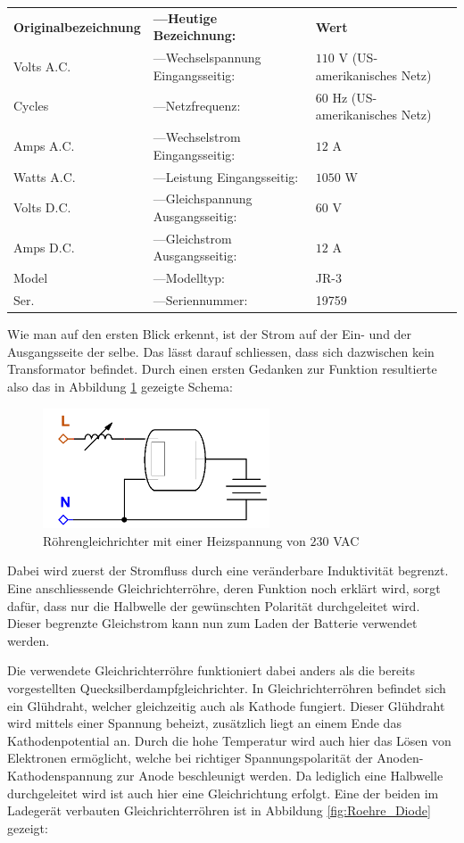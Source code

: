 \begin{tabular}{lll}
	\textbf{Originalbezeichnung} & \textbf{---\quad Heutige Bezeichnung:} & \textbf{Wert} \\
	Volts A.C. & ---\quad Wechselspannung Eingangsseitig: & $110$ V (US-amerikanisches Netz) \\
	Cycles & ---\quad Netzfrequenz: & $60$ Hz (US-amerikanisches Netz)\\
	Amps A.C. & ---\quad Wechselstrom Eingangsseitig: & $12$ A \\
	Watts A.C. & ---\quad Leistung Eingangsseitig: & $1050$ W \\
	Volts D.C. & ---\quad Gleichspannung Ausgangsseitig: & $60$ V \\
	Amps D.C. & ---\quad Gleichstrom Ausgangsseitig: & $12$ A \\
	Model & ---\quad Modelltyp: & JR-3 \\
	Ser. & ---\quad Seriennummer: & 19759
\end{tabular}

Wie man auf den ersten Blick erkennt, ist der Strom auf der Ein- und der Ausgangsseite der selbe. Das lässt darauf schliessen, dass sich dazwischen kein Transformator befindet. Durch einen ersten Gedanken zur Funktion resultierte also das in Abbildung \ref{fig:Ladegeraet1} gezeigte Schema:

\begin{figure}[h]
	\centering
		\includegraphics[width=0.60\textwidth]{images/Ladegeraet_Alt_1.PNG}
	\caption{Röhrengleichrichter mit einer Heizspannung von $230$ VAC}
	\label{fig:Ladegeraet1}
\end{figure}

Dabei wird zuerst der Stromfluss durch eine veränderbare Induktivität begrenzt. Eine anschliessende Gleichrichterröhre, deren Funktion noch erklärt wird, sorgt dafür, dass nur die Halbwelle der gewünschten Polarität durchgeleitet wird. Dieser begrenzte Gleichstrom kann nun zum Laden der Batterie verwendet werden.

Die verwendete Gleichrichterröhre funktioniert dabei anders als die bereits vorgestellten Quecksilberdampfgleichrichter. In Gleichrichterröhren befindet sich ein Glühdraht, welcher gleichzeitig auch als Kathode fungiert. Dieser Glühdraht wird mittels einer Spannung beheizt, zusätzlich liegt an einem Ende das Kathodenpotential an. Durch die hohe Temperatur wird auch hier das Lösen von Elektronen ermöglicht, welche bei richtiger Spannungspolarität der Anoden-Kathodenspannung zur Anode beschleunigt werden. Da lediglich eine Halbwelle durchgeleitet wird ist auch hier eine Gleichrichtung erfolgt. Eine der beiden im Ladegerät verbauten Gleichrichterröhren ist in Abbildung \ref{fig:Roehre_Diode} gezeigt: \newpage

